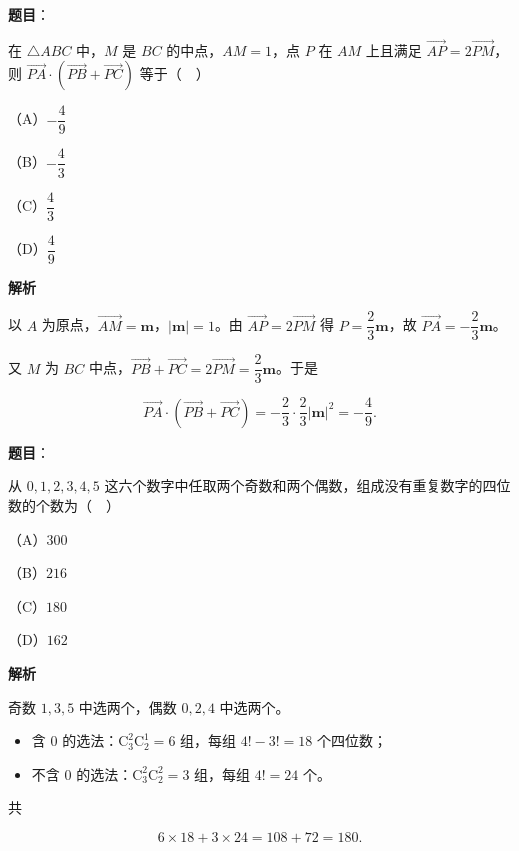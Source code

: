 \begin{answer}

\textbf{题目}：

在 $\triangle ABC$ 中，$M$ 是 $BC$ 的中点，$AM=1$，点 $P$ 在 $AM$ 上且满足 $\overrightarrow{AP}=2\overrightarrow{PM}$，则 $\overrightarrow{PA}\cdot(\overrightarrow{PB}+\overrightarrow{PC})$ 等于（　）

（A）$-\dfrac49$

（B）$-\dfrac43$

（C）$\dfrac43$

（D）$\dfrac49$

\textbf{解析}

以 $A$ 为原点，$\overrightarrow{AM}=\boldsymbol m$，$|\boldsymbol m|=1$。由 $\overrightarrow{AP}=2\overrightarrow{PM}$ 得 $P=\dfrac23\boldsymbol m$，故 $\overrightarrow{PA}=-\dfrac23\boldsymbol m$。

又 $M$ 为 $BC$ 中点，$\overrightarrow{PB}+\overrightarrow{PC}=2\overrightarrow{PM}=\dfrac23\boldsymbol m$。于是

\nopagebreak[4]
\[\overrightarrow{PA}\cdot(\overrightarrow{PB}+\overrightarrow{PC})
=-\frac23\cdot\frac23|\boldsymbol m|^2=-\frac49.\]


\end{answer}
\begin{answer}

\textbf{题目}：

从 $0,1,2,3,4,5$ 这六个数字中任取两个奇数和两个偶数，组成没有重复数字的四位数的个数为（　）

（A）$300$

（B）$216$

（C）$180$

（D）$162$

\textbf{解析}

奇数 $1,3,5$ 中选两个，偶数 $0,2,4$ 中选两个。

\begin{itemize}
\item 含 $0$ 的选法：$\mathrm C_3^2\mathrm C_2^1=6$ 组，每组 $4!-3!=18$ 个四位数；
\item 不含 $0$ 的选法：$\mathrm C_3^2\mathrm C_2^2=3$ 组，每组 $4!=24$ 个。
\end{itemize}

共

\nopagebreak[4]
\[6\times18+3\times24=108+72=180.\]


\end{answer}

